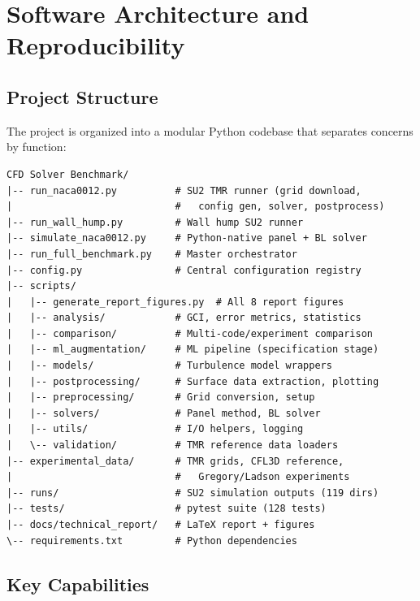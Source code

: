 \documentclass[11pt,a4paper]{article}
\begin{document}
\section{Software Architecture and Reproducibility}
\label{sec:software}

\subsection{Project Structure}

The project is organized into a modular Python codebase that separates
concerns by function:

\begin{verbatim}
CFD Solver Benchmark/
|-- run_naca0012.py          # SU2 TMR runner (grid download,
|                            #   config gen, solver, postprocess)
|-- run_wall_hump.py         # Wall hump SU2 runner
|-- simulate_naca0012.py     # Python-native panel + BL solver
|-- run_full_benchmark.py    # Master orchestrator
|-- config.py                # Central configuration registry
|-- scripts/
|   |-- generate_report_figures.py  # All 8 report figures
|   |-- analysis/            # GCI, error metrics, statistics
|   |-- comparison/          # Multi-code/experiment comparison
|   |-- ml_augmentation/     # ML pipeline (specification stage)
|   |-- models/              # Turbulence model wrappers
|   |-- postprocessing/      # Surface data extraction, plotting
|   |-- preprocessing/       # Grid conversion, setup
|   |-- solvers/             # Panel method, BL solver
|   |-- utils/               # I/O helpers, logging
|   \-- validation/          # TMR reference data loaders
|-- experimental_data/       # TMR grids, CFL3D reference,
|                            #   Gregory/Ladson experiments
|-- runs/                    # SU2 simulation outputs (119 dirs)
|-- tests/                   # pytest suite (128 tests)
|-- docs/technical_report/   # LaTeX report + figures
\-- requirements.txt         # Python dependencies
\end{verbatim}

\subsection{Key Capabilities}
\end{document}
